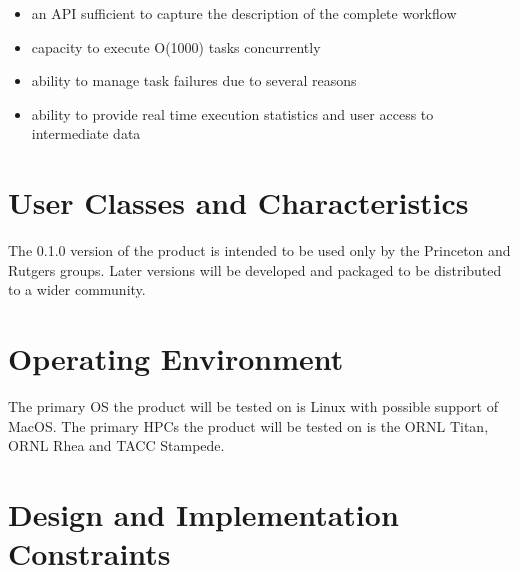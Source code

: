 \documentclass{scrreprt}
\def\myversion{0.1.0 }
\begin{document}
\begin{itemize}
\item an API sufficient to capture the description of the complete workflow
\item capacity to execute O(1000) tasks concurrently
\item ability to manage task failures due to several reasons
\item ability to provide real time execution statistics and user access to intermediate data
\end{itemize}



\section{User Classes and Characteristics}

The \myversion version of the product is intended to be used only by the Princeton and Rutgers groups. Later versions will be developed and packaged to be distributed to a wider community.

\section{Operating Environment}

The primary OS the product will be tested on is Linux with possible support of MacOS. The primary HPCs the product will be tested on is the ORNL Titan, ORNL Rhea and TACC Stampede.

\section{Design and Implementation Constraints}
\end{document}
